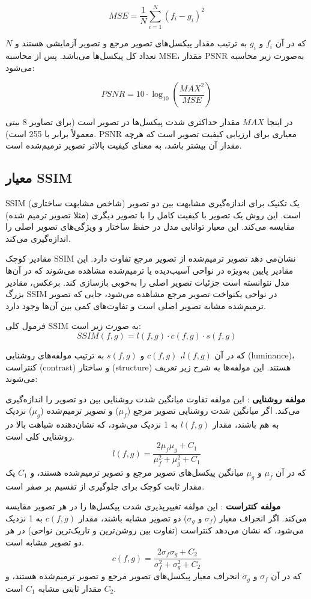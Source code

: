 \[
MSE = \frac{1}{N} \sum_{i=1}^{N} (f_i - g_i)^2
\]

که در آن $f_i$ و $g_i$ به ترتیب مقدار پیکسل‌های تصویر مرجع و تصویر آزمایشی هستند و $N$ تعداد کل پیکسل‌ها می‌باشد. پس از محاسبه MSE، مقدار PSNR به‌صورت زیر محاسبه می‌شود:

\begin{equation}
	PSNR = 10 \cdot \log_{10}\left(\frac{MAX^2}{MSE}\right)
\end{equation}

در اینجا $MAX$ مقدار حداکثری شدت پیکسل‌ها در تصویر است (برای تصاویر 8 بیتی معمولاً برابر با 255 است). PSNR معیاری برای ارزیابی کیفیت تصویر است که هرچه مقدار آن بیشتر باشد، به معنای کیفیت بالاتر تصویر ترمیم‌شده است.

\subsection{معیار SSIM}

SSIM
(شاخص مشابهت ساختاری) یک تکنیک برای اندازه‌گیری مشابهت بین دو تصویر است. این روش یک تصویر با کیفیت کامل را با تصویر دیگری (مثلا تصویر ترمیم شده) مقایسه می‌کند. این معیار توانایی مدل در حفظ ساختار و ویژگی‌های تصویر اصلی را اندازه‌گیری می‌کند.

مقادیر کوچک SSIM نشان‌می دهد تصویر ترمیم‌شده از تصویر مرجع تفاوت دارد. این مقادیر پایین به‌ویژه در نواحی آسیب‌دیده یا ترمیم‌شده مشاهده می‌شوند که در آن‌ها مدل نتوانسته است جزئیات تصویر اصلی را به‌خوبی بازسازی کند. برعکس، مقادیر بزرگ SSIM در نواحی یکنواخت تصویر مرجع مشاهده می‌شود، جایی که تصویر ترمیم‌شده مشابه تصویر اصلی است و تفاوت‌های کمی بین آن‌ها وجود دارد.

فرمول کلی SSIM به صورت زیر است:
$$
SSIM(f, g) = l(f, g) \cdot c(f, g) \cdot s(f, g)
$$

که در آن $l(f, g)$، $c(f, g)$ و $s(f, g)$ به ترتیب مولفه‌های روشنایی (luminance)، کنتراست (contrast) و ساختار (structure) هستند. این مولفه‌ها به شرح زیر تعریف می‌شوند:

\textbf{مولفه روشنایی}%
: این مولفه تفاوت میانگین شدت روشنایی بین دو تصویر را اندازه‌گیری می‌کند. اگر میانگین شدت روشنایی تصویر مرجع ($\mu_f$) و تصویر ترمیم‌شده ($\mu_g$) نزدیک به هم باشند، مقدار $l(f, g)$ به 1 نزدیک می‌شود، که نشان‌دهنده شباهت بالا در روشنایی کلی است.
$$
l(f, g) = \frac{2\mu_f \mu_g + C_1}{\mu_f^2 + \mu_g^2 + C_1}
$$
که در آن $\mu_f$ و $\mu_g$ میانگین پیکسل‌های تصویر مرجع و تصویر ترمیم‌شده هستند، و $C_1$ یک مقدار ثابت کوچک برای جلوگیری از تقسیم بر صفر است.

\textbf{مولفه کنتراست}%
:    این مولفه تغییرپذیری شدت پیکسل‌ها را در هر تصویر مقایسه می‌کند. اگر انحراف معیار ($\sigma_f$ و $\sigma_g$) دو تصویر مشابه باشند، مقدار $c(f, g)$ به 1 نزدیک می‌شود، که نشان می‌دهد کنتراست (تفاوت بین روشن‌ترین و تاریک‌ترین نواحی) در هر دو تصویر مشابه است.
$$
c(f, g) = \frac{2\sigma_f \sigma_g + C_2}{\sigma_f^2 + \sigma_g^2 + C_2}
$$
که در آن $\sigma_f$ و $\sigma_g$ انحراف معیار پیکسل‌های تصویر مرجع و تصویر ترمیم‌شده هستند، و $C_2$ مقدار ثابتی مشابه $C_1$ است.

